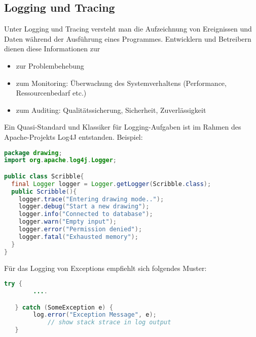 \subsection{Logging und Tracing}
Unter Logging und Tracing versteht man die Aufzeichnung von
Ereignissen und Daten während der Ausführung eines Programmes.
Entwicklern und Betreibern dienen diese Informationen zur
\begin{itemize}
\item zur Problembehebung
\item zum Monitoring: Überwachung des Systemverhaltens (Performance,
      Ressourcenbedarf etc.)
\item zum Auditing: Qualitätssicherung, Sicherheit, Zuverlässigkeit
\end{itemize}
Ein Quasi-Standard und Klassiker für Logging-Aufgaben
ist im Rahmen des Apache-Projekts Log4J entstanden.
\newpage
 Beispiel:
\begin{lstlisting}[language=java]
package drawing;
import org.apache.log4j.Logger;

public class Scribble{
  final Logger logger = Logger.getLogger(Scribble.class);
  public Scribble(){
    logger.trace("Entering drawing mode..");
    logger.debug("Start a new drawing");
    logger.info("Connected to database");
    logger.warn("Empty input");
    logger.error("Permission denied");
    logger.fatal("Exhausted memory");
  }
}
\end{lstlisting}
Für das Logging von Exceptions empfiehlt sich folgendes Muster:
\begin{lstlisting}[language=java]
  try {
	    ....

   } catch (SomeException e) {
	    log.error("Exception Message", e);
			// show stack strace in log output
   }
\end{lstlisting}
